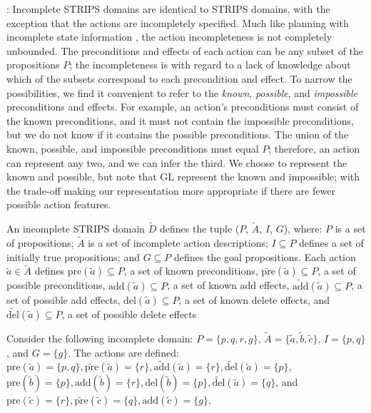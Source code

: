 \documentclass[letterpaper]{article}
\def\und#1{\noindent{\bf #1}:}
\def\citep#1{\cite{#1}}
\begin{document}
\und{Incomplete STRIPS Domains}
Incomplete STRIPS domains are identical to STRIPS domains, with the exception
that the actions are incompletely specified.  Much like planning with incomplete
state information \citep{pff,aij-mclug}, the action incompleteness is not
completely unbounded.  The preconditions and effects of each action can be any
subset of the propositions $P$; the incompleteness is with regard to a lack of
knowledge about which of the subsets correspond to each precondition and effect.
 To narrow the possibilities, we find it convenient to refer to the {\em known},
{\em possible}, and {\em impossible} preconditions and effects.  For example, an
action's preconditions must consist of the known preconditions, and it must not
contain the impossible preconditions, but we do not know if it contains the
possible preconditions.  The union of the known, possible, and impossible
preconditions must equal $P$; therefore, an action can represent any two, and we
can infer the third.  We choose to represent the known and possible, but note
that GL represent the known and impossible; with the trade-off making our
representation more appropriate if there are fewer possible action features.




An incomplete STRIPS domain $\tilde{D}$  defines the tuple ($P$, $\tilde{A}$,
$I$, $G$), where: $P$ is a  set of propositions; $\tilde{A}$ is a set of
incomplete action descriptions; $I \subseteq P$ defines a set of initially true
propositions; and $G \subseteq P$ defines the goal propositions. Each action
$\tilde{a} \in \tilde{A}$ defines $\text{pre}(\tilde{a}) \subseteq P$, a set of
known preconditions, $\widetilde{\text{pre}}(\tilde{a}) \subseteq P$, a set of
possible preconditions, $\text{add}(\tilde{a}) \subseteq P$, a set of known add
effects,  $\widetilde{\text{add}}(\tilde{a}) \subseteq P$, a set of possible add
effects, $\text{del}(\tilde{a}) \subseteq P$, a set of known delete effects, and
$\widetilde{\text{del}}(\tilde{a}) \subseteq P$, a set of possible delete
effects

Consider the following incomplete domain: $P = \{p, q, r, g\}$, $\tilde{A} = \{\tilde{a}, \tilde{b}, \tilde{c}\}$, $I = \{p, q\}$, and $G= \{g\}$.  The actions are defined: 
$\text{pre}(\tilde{a}) = \{p, q\}, \widetilde{\text{pre}}(\tilde{a})  = \{r\}, \widetilde{\text{add}}(\tilde{a}) = \{r\},  \widetilde{\text{del}}(\tilde{a}) = \{p\}$, $
  \text{pre}(\tilde{b}) = \{p\}, 
 \text{add}(\tilde{b}) = \{r\}, 
  \text{del}(\tilde{b}) = \{p\}, \widetilde{\text{del}}(\tilde{a}) = \{q\}$, and 
 $ \text{pre}(\tilde{c}) = \{r\}, \widetilde{\text{pre}}(\tilde{c})  = \{q\}, 
\text{add}(\tilde{c}) = \{g\}$.
\end{document}
